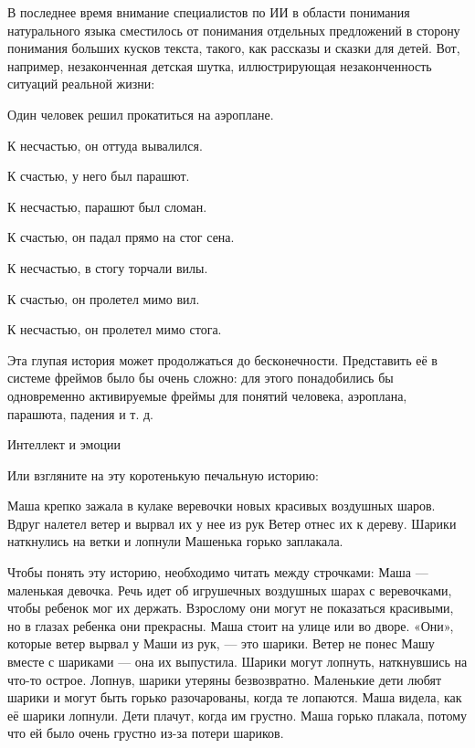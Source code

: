 \documentclass[../main.tex]{subfiles}
\begin{document}
В последнее время внимание специалистов по ИИ в области понимания натурального языка сместилось от понимания отдельных предложений в сторону понимания больших кусков текста, такого, как рассказы и сказки для детей. Вот, например, незаконченная детская шутка, иллюстрирующая незаконченность ситуаций реальной жизни:

Один человек решил прокатиться на аэроплане.

К несчастью, он оттуда вывалился.

К счастью, у него был парашют.

К несчастью, парашют был сломан.

К счастью, он падал прямо на стог сена.

К несчастью, в стогу торчали вилы.

К счастью, он пролетел мимо вил.

К несчастью, он пролетел мимо стога.

Эта глупая история может продолжаться до бесконечности. Представить её в системе фреймов было бы очень сложно: для этого понадобились бы одновременно активируемые фреймы для понятий человека, аэроплана, парашюта, падения и т. д.

Интеллект и эмоции

Или взгляните на эту коротенькую печальную историю:

Маша крепко зажала в кулаке веревочки новых красивых воздушных шаров. Вдруг налетел ветер и вырвал их у нее из рук Ветер отнес их к дереву. Шарики наткнулись на ветки и лопнули Машенька горько заплакала.

Чтобы понять эту историю, необходимо читать между строчками: Маша --- маленькая девочка. Речь идет об игрушечных воздушных шарах с веревочками, чтобы ребенок мог их держать. Взрослому они могут не показаться красивыми, но в глазах ребенка они прекрасны. Маша стоит на улице или во дворе. «Они», которые ветер вырвал у Маши из рук, --- это шарики. Ветер не понес Машу вместе с шариками --- она их выпустила. Шарики могут лопнуть, наткнувшись на что-то острое. Лопнув, шарики утеряны безвозвратно. Маленькие дети любят шарики и могут быть горько разочарованы, когда те лопаются. Маша видела, как её шарики лопнули. Дети плачут, когда им грустно. Маша горько плакала, потому что ей было очень грустно из-за потери шариков.
\end{document}
